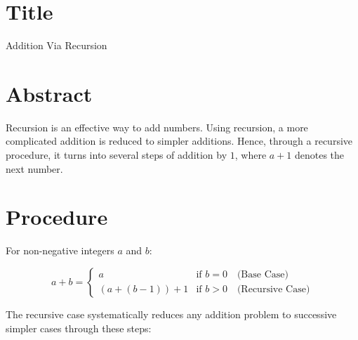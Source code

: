\documentclass{article}
\begin{document}
\section{Title}
Addition Via Recursion

\section{Abstract}
Recursion is an effective way to add numbers. Using recursion, a more complicated addition is reduced to simpler additions. Hence, through a recursive procedure, it turns into several steps of addition by $1$, where $a+1$ denotes the next number.
\section{Procedure}
For non-negative integers \(a\) and \(b\):

\[
    a + b = \begin{cases}
        a                 & \text{if } b = 0 \quad \text{(Base Case)}      \\
        (a + (b - 1)) + 1 & \text{if } b > 0 \quad \text{(Recursive Case)}
    \end{cases}
\]

The recursive case systematically reduces any addition problem to successive simpler cases through these steps:
\end{document}

